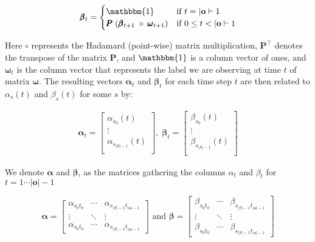 \begin{equation}
    \label{eq:beta}
    \pmb{\beta}_t =
    \begin{cases}
        \mathbbm{1} & \text{if } t = |\mathbf{o}|-1        \\
        \pmb{P} \; (\pmb{\beta}_{t + 1} \; \circ \; \pmb{\omega}_{t + 1}) & \text{if } 0 \leq t < |\mathbf{o}|-1 \\
    \end{cases}
\end{equation}

Here $\circ$ represents the Hadamard (point-wise) matrix multiplication, $\pmb{P}^\top$ denotes the transpose of the matrix $\pmb{P}$, and $\mathbbm{1}$ is a column vector of ones, and $\pmb{\omega}_t$ is the column vector that represents the label we are observing at time $t$ of matrix $\pmb{\omega}$.
The resulting vectors $\pmb{\alpha}_t$ and $\pmb{\beta}_t$ for each time step $t$ are then related to $\alpha_s(t)$ and $\beta_s(t)$ for some $s$ by:

\begin{align}
\pmb{\alpha}
    _t = \begin{bmatrix}
             \alpha_{s_0}(t)       \\
             \vdots                \\
             \alpha_{s_{|S|-1}}(t) \\
    \end{bmatrix}, \;
    \pmb{\beta}_t = \begin{bmatrix}
                    \beta_{s_0}(t)       \\
                    \vdots               \\
                    \beta_{s_{|S|-1}}(t) \\
    \end{bmatrix}
\end{align}

We denote $\pmb{\alpha}$ and $\pmb{\beta}$, as the matrices gathering the 
columns $\alpha_t$ and $\beta_t$ for $t = 1\cdots |\mathbf{o}|-1$

\begin{equation}
    \pmb{\alpha} = 
        \begin{bmatrix}
            \alpha_{s_0 t_{0}}  & \cdots & \alpha_{s_{|S|-1}t_{|\textbf{o}|-1}} \\
            \vdots               & \ddots & \vdots                      \\
            \alpha_{s_0 t_{0}}  & \cdots & \alpha_{s_{|S|-1}t_{|\textbf{o}|-1}}
        \end{bmatrix}
        \text{ and }
    \pmb{\beta} = 
        \begin{bmatrix}
            \beta_{s_0 t_{0}}  & \cdots & \beta_{s_{|S|-1}t_{|\textbf{o}|-1}} \\
            \vdots               & \ddots & \vdots                      \\
            \beta_{s_0 t_{0}}  & \cdots & \beta_{s_{|S|-1}t_{|\textbf{o}|-1}}
        \end{bmatrix}\label{eq:forward-backward-matrix}
\end{equation}


